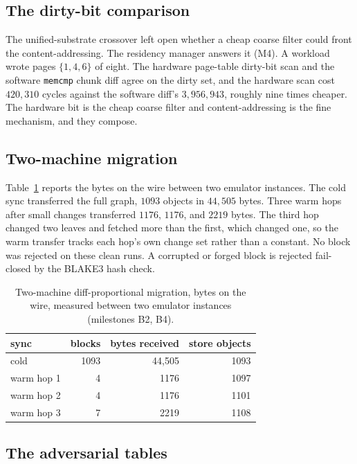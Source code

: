 \documentclass[10pt,twocolumn]{article}
\begin{document}
\subsection{The dirty-bit comparison}

The unified-substrate crossover left open whether a cheap coarse filter could
front the content-addressing. The residency manager answers it (M4). A workload
wrote pages $\{1,4,6\}$ of eight. The hardware page-table dirty-bit scan and the
software \texttt{memcmp} chunk diff agree on the dirty set, and the hardware scan
cost $420{,}310$ cycles against the software diff's $3{,}956{,}943$, roughly nine
times cheaper. The hardware bit is the cheap coarse filter and content-addressing
is the fine mechanism, and they compose.

\subsection{Two-machine migration}

Table~\ref{tab:migration} reports the bytes on the wire between two emulator
instances. The cold sync transferred the full graph, $1093$ objects in $44{,}505$
bytes. Three warm hops after small changes transferred $1176$, $1176$, and $2219$
bytes. The third hop changed two leaves and fetched more than the first, which
changed one, so the warm transfer tracks each hop's own change set rather than a
constant. No block was rejected on these clean runs. A corrupted or forged block
is rejected fail-closed by the BLAKE3 hash check.

\begin{table}[t]
\centering
\caption{Two-machine diff-proportional migration, bytes on the wire, measured
between two emulator instances (milestones B2, B4).}
\label{tab:migration}
\small
\begin{tabular}{lrrr}
\toprule
sync & blocks & bytes received & store objects \\
\midrule
cold  & 1093 & 44{,}505 & 1093 \\
warm hop 1 & 4 & 1176 & 1097 \\
warm hop 2 & 4 & 1176 & 1101 \\
warm hop 3 & 7 & 2219 & 1108 \\
\bottomrule
\end{tabular}
\end{table}

\subsection{The adversarial tables}
\end{document}
